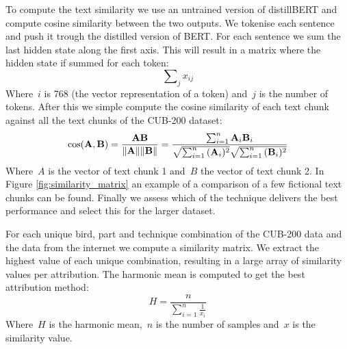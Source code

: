\documentclass[a4paper, 12pt, oneside]{book} %
\begin{document}
To compute the text similarity we use an untrained version of distillBERT and compute cosine similarity between the two outputs.
We tokenise each sentence and push it trough the distilled version of BERT.
For each sentence we sum the last hidden state along the first axis.
This will result in a matrix where the hidden state if summed for each token:
\begin{equation}
     \sum\nolimits_{j}^{} x_{ij} 
\end{equation}
Where~$i$ is 768 (the vector representation of a token) and~$j$ is the number of tokens. 
After this we simple compute the cosine similarity of each text chunk against all the text chunks of the CUB-200 dataset:
\begin{equation}
\cos ({\bf A},{\bf B})= {{\bf A} {\bf B} \over \|{\bf A}\| \|{\bf B}\|} = \frac{ \sum_{i=1}^{n}{{\bf A}_i{\bf B}_i} }{ \sqrt{\sum_{i=1}^{n}{({\bf A}_i)^2}} \sqrt{\sum_{i=1}^{n}{({\bf B}_i)^2}} }
\end{equation}
Where~$A$ is the vector of text chunk 1 and~$B$ the vector of text chunk 2. 
In Figure \ref{fig:similarity_matrix} an example of a comparison of a few fictional text chunks can be found. 
Finally we assess which of the technique delivers the best performance and select this for the larger dataset.

For each unique bird, part and technique combination of the CUB-200 data and the data from the internet we compute a similarity matrix.
We extract the highest value of each unique combination, resulting in a large array of similarity values per attribution.
The harmonic mean is computed to get the best attribution method:
\begin{equation}
    H = \frac{n}{\sum\limits_{i=1}^n \frac1{x_i}}
\end{equation}
Where~$H$ is the harmonic mean,~$n$ is the number of samples and~$x$ is the similarity value. 
\end{document}
